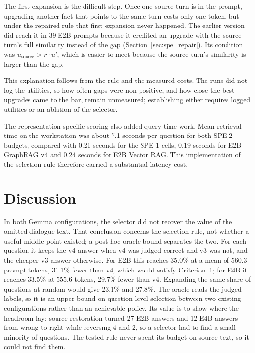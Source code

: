 The first expansion is the difficult step. Once one source turn is in the prompt, upgrading another fact
that points to the same turn costs only one token, but under the repaired rule that first expansion
never happened. The earlier version did reach it in 39 E2B prompts because it credited an upgrade
with the source turn's full similarity instead of the gap (Section~\ref{sec:spe_repair}). Its
condition was $u_{\text{source}} > r \cdot u'$, which is easier to meet because the source turn's
similarity is larger than the gap.

This explanation follows from the rule and the measured costs. The runs did not log the
utilities, so how often gaps were non-positive, and how close the best upgrades came to the bar,
remain unmeasured; establishing either requires logged utilities or an ablation of the selector.

The representation-specific scoring also added query-time work. Mean retrieval time on the workstation was
about 7.1 seconds per question for both SPE-2 budgets, compared with 0.21 seconds for the SPE-1
cells, 0.19 seconds for E2B GraphRAG v4 and 0.24 seconds for E2B Vector RAG. This implementation of
the selection rule therefore carried a substantial latency cost.

\section{Discussion}
\label{sec:spe_discussion}

In both Gemma configurations, the selector did not recover the value of the omitted dialogue text.
That conclusion concerns the selection rule, not whether a useful middle point existed; a post hoc
oracle bound separates the two. For each question it keeps the v4 answer when v4 was judged correct
and v3 was not, and the cheaper v3 answer otherwise. For E2B this reaches 35.0\% at a mean of 560.3
prompt tokens, 31.1\% fewer than v4, which would satisfy Criterion~1; for E4B it reaches 33.5\% at
555.6 tokens, 29.7\% fewer than v4. Expanding the same share of questions at random would give 23.1\%
and 27.8\%. The oracle reads the judged labels, so it is an upper bound on question-level selection
between two existing configurations rather than an achievable policy. Its value is to show where the
headroom lay: source restoration turned 27 E2B answers and 12 E4B answers from wrong to right while
reversing 4 and 2, so a selector had to find a small minority of questions. The tested rule never
spent its budget on source text, so it could not find them.

